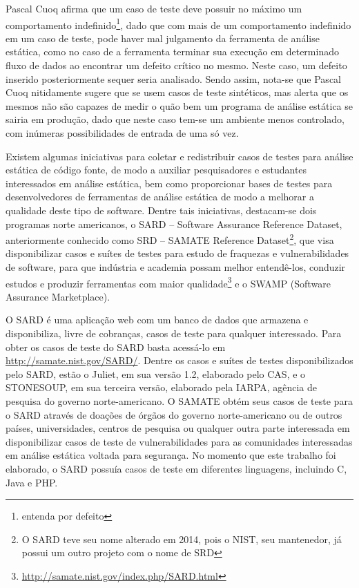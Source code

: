   Pascal Cuoq \cite{pascal} afirma que um caso de teste deve possuir no máximo um comportamento indefinido\footnote{entenda por defeito}, dado que com mais de um comportamento indefinido em um caso de teste, pode haver mal julgamento da ferramenta de análise estática, como no caso de a ferramenta terminar sua execução em determinado fluxo de dados ao encontrar um defeito crítico no mesmo. Neste caso, um defeito inserido posteriormente sequer seria analisado. Sendo assim, nota-se que Pascal Cuoq nitidamente sugere que se usem casos de teste sintéticos, mas alerta que os mesmos não são capazes de medir o quão bem um programa de análise estática se sairia em produção, dado que neste caso tem-se um ambiente menos controlado, com inúmeras possibilidades de entrada de uma só vez.

  Existem algumas iniciativas para coletar e redistribuir casos de testes para análise estática de código fonte, de modo a auxiliar pesquisadores e estudantes interessados em análise estática, bem como proporcionar bases de testes para desenvolvedores de ferramentas de análise estática de modo a melhorar a qualidade deste tipo de software. Dentre tais iniciativas, destacam-se dois programas norte americanos, o SARD  – Software Assurance Reference Dataset, anteriormente conhecido como SRD – SAMATE Reference Dataset\footnote{O SARD teve seu nome alterado em 2014, pois o NIST, seu mantenedor, já possui um outro projeto com o nome de SRD}, que visa disponibilizar casos e suítes de testes para estudo de fraquezas e vulnerabilidades de software, para que indústria e academia possam melhor entendê-los, conduzir estudos e produzir ferramentas com maior qualidade\footnote{\url{http://samate.nist.gov/index.php/SARD.html}} e o SWAMP (Software Assurance Marketplace).

  O SARD é uma aplicação web com um banco de dados que armazena e disponibiliza, livre de cobranças, casos de teste para qualquer interessado. Para obter os casos de teste do SARD basta acessá-lo em \url{http://samate.nist.gov/SARD/}. Dentre os casos e suítes de testes disponibilizados pelo SARD, estão o Juliet, em sua versão 1.2, elaborado pelo CAS, e o STONESOUP, em sua terceira versão, elaborado pela IARPA, agência de pesquisa do governo norte-americano. O SAMATE obtém seus casos de teste para o SARD através de doações de órgãos do governo norte-americano ou de outros países, universidades, centros de pesquisa ou qualquer outra parte interessada em disponibilizar casos de teste de vulnerabilidades para as comunidades interessadas em análise estática voltada para segurança. No momento que este trabalho foi elaborado, o SARD possuía casos de teste em diferentes linguagens, incluindo C, Java e PHP.


